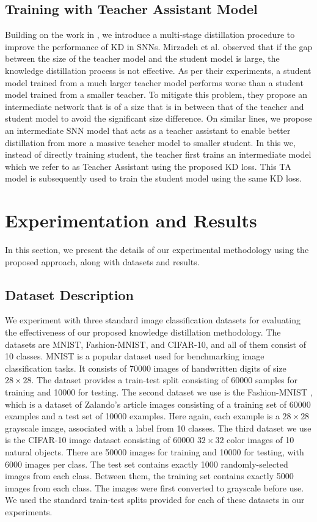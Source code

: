 \documentclass{article}
\begin{document}
\subsection{Training with Teacher Assistant Model}
Building on the work in \cite{mirzadeh2019improved}, we introduce a multi-stage distillation procedure to improve the performance of KD in SNNs. Mirzadeh et al. observed that if the gap between the size of the teacher model and the student model is large, the knowledge distillation process is not effective. As per their experiments, a student model trained from a much larger teacher model performs worse than a student model trained from a smaller teacher. To mitigate this problem, they propose an intermediate network that is of a size that is in between that of the teacher and student model to avoid the significant size difference. On similar lines, we propose an intermediate SNN model that acts as a teacher assistant to enable better distillation from more a massive teacher model to smaller student. In this we, instead of directly training student, the teacher first trains an intermediate model which we refer to as Teacher Assistant using the proposed KD loss. This TA model is subsequently used to train the student model using the same KD loss.

\section{Experimentation and Results}
In this section, we present the details of our experimental methodology using the proposed approach, along with datasets and results.

\subsection{Dataset Description}
We experiment with three standard image classification datasets for evaluating the effectiveness of our proposed knowledge distillation methodology. The datasets are MNIST, Fashion-MNIST, and CIFAR-10, and all of them consist of 10 classes. MNIST is a popular dataset used for benchmarking image classification tasks. It consists of 70000 images of handwritten digits of size $28 \times 28$. The dataset provides a train-test split consisting of 60000 samples for training and 10000 for testing. The second dataset we use is the Fashion-MNIST \cite{xiao2017fashion}, which is a dataset of Zalando's article images consisting of a training set of 60000 examples and a test set of 10000 examples. Here again, each example is a $28 \times 28$ grayscale image, associated with a label from 10 classes. The third dataset we use is the CIFAR-10 image dataset consisting of 60000 $32 \times 32$ color images of 10 natural objects. There are 50000 images for training and 10000 for testing, with 6000 images per class. The test set contains exactly 1000 randomly-selected images from each class. Between them, the training set contains exactly 5000 images from each class. The images were first converted to grayscale before use. We used the standard train-test splits provided for each of these datasets in our experiments.
\end{document}
